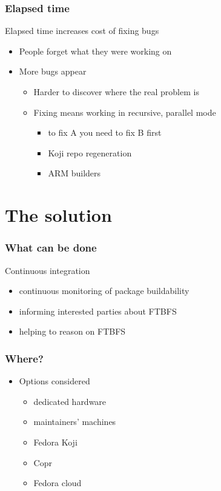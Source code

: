 \documentclass[pdftex,unicode,xcolor=table]{beamer}
\begin{document}
\begin{frame}
  \frametitle{Elapsed time}
  Elapsed time increases cost of fixing bugs
  \begin{itemize}
  \item People forget what they were working on
  \item More bugs appear
    \begin{itemize}
      \item Harder to discover where the real problem is
      \item Fixing means working in recursive, parallel mode
      \begin{itemize}
        \item to fix A you need to fix B first
        \item Koji repo regeneration
        \item ARM builders
      \end{itemize}
    \end{itemize}
  \end{itemize}
\end{frame}


\section{The solution}
\Large
\begin{frame}
  \frametitle{What can be done}
  Continuous integration
  \begin{itemize}
    \item continuous monitoring of package buildability
    \item informing interested parties about FTBFS
    \item helping to reason on FTBFS
  \end{itemize}
\end{frame}

\begin{frame}
  \frametitle{Where?}
  \begin{itemize}
  \item Options considered
    \begin{itemize}
      \item dedicated hardware
      \item maintainers' machines
      \item Fedora Koji
      \item Copr
      \item Fedora cloud
    \end{itemize}
  \end{itemize}
\end{frame}
\end{document}
